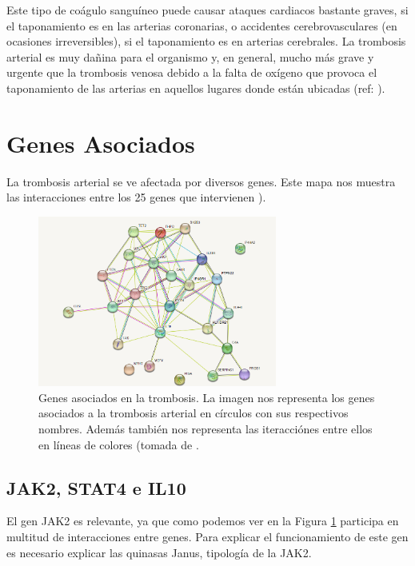 Este tipo de coágulo sanguíneo puede causar ataques cardiacos bastante graves, si el taponamiento es en las arterias coronarias, o accidentes cerebrovasculares (en ocasiones irreversibles), si el taponamiento es en arterias cerebrales. La trombosis arterial es muy dañina para el organismo y, en general, mucho más grave y urgente que la trombosis venosa debido a la falta de oxígeno que provoca el taponamiento de las arterias en aquellos lugares donde están ubicadas (ref: \cite{Trombosis_Bayer}). 
	
\section{Genes Asociados}
		La trombosis arterial se ve afectada por diversos genes. Este mapa nos muestra las interacciones entre los 25 genes que intervienen ).
		
    \begin{figure}[h]
        \centering
    	\includegraphics[width=0.70\textwidth]{figures/genes_asociados.png}
    	\caption{Genes asociados en la trombosis. La imagen nos representa los genes asociados a la trombosis arterial en círculos con sus respectivos nombres. Además también nos representa las iteracciónes entre ellos en líneas de colores (tomada de \cite{grafo}.}
    	\label{fig: Figura 2}
      \end{figure}
\subsection{\textbf {JAK2, STAT4 e IL10}}

          El gen JAK2 es relevante, ya que como podemos ver en la Figura \ref{fig: Figura 2}  participa en multitud de interacciones entre genes. Para explicar el funcionamiento de este gen es necesario explicar las quinasas Janus, tipología de la JAK2.\\
		
